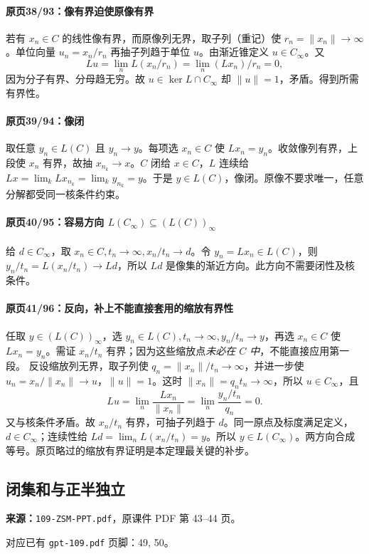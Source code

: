 \paragraph{原页38/93：像有界迫使原像有界}
若有 $x_n\in C$ 的线性像有界，而原像列无界，取子列（重记）使 $r_n=\|x_n\|\to\infty$。单位向量 $u_n=x_n/r_n$ 再抽子列趋于单位 $u$。由渐近锥定义 $u\in C_\infty$。又
\[Lu=\lim_n L(x_n/r_n)=\lim_n(Lx_n)/r_n=0,\]
因为分子有界、分母趋无穷。故 $u\in\ker L\cap C_\infty$ 却 $\|u\|=1$，矛盾。得到所需有界性。
\paragraph{原页39/94：像闭}
取任意 $y_n\in L(C)$ 且 $y_n\to y$。每项选 $x_n\in C$ 使 $Lx_n=y_n$。收敛像列有界，上段使 $x_n$ 有界，故抽 $x_{n_k}\to x$。$C$ 闭给 $x\in C$，$L$ 连续给 $Lx=\lim_kLx_{n_k}=\lim_ky_{n_k}=y$。于是 $y\in L(C)$，像闭。原像不要求唯一，任意分解都受同一核条件约束。
\paragraph{原页40/95：容易方向 $L(C_\infty)\subseteq(L(C))_\infty$}
给 $d\in C_\infty$，取 $x_n\in C,t_n\to\infty,x_n/t_n\to d$。令 $y_n=Lx_n\in L(C)$，则 $y_n/t_n=L(x_n/t_n)\to Ld$，所以 $Ld$ 是像集的渐近方向。此方向不需要闭性及核条件。
\paragraph{原页41/96：反向，补上不能直接套用的缩放有界性}
任取 $y\in(L(C))_\infty$，选 $y_n\in L(C),t_n\to\infty,y_n/t_n\to y$，再选 $x_n\in C$ 使 $Lx_n=y_n$。需证 $x_n/t_n$ 有界；因为这些缩放点\emph{未必在 $C$ 中}，不能直接应用第一段。
反设缩放列无界，取子列使 $q_n=\|x_n\|/t_n\to\infty$，并进一步使 $u_n=x_n/\|x_n\|\to u$，$\|u\|=1$。这时 $\|x_n\|=q_nt_n\to\infty$，所以 $u\in C_\infty$，且
\[Lu=\lim_n\frac{Lx_n}{\|x_n\|}=\lim_n\frac{y_n/t_n}{q_n}=0.\]
又与核条件矛盾。故 $x_n/t_n$ 有界，可抽子列趋于 $d$。同一原点及标度满足定义，$d\in C_\infty$；连续性给 $Ld=\lim_nL(x_n/t_n)=y$。所以 $y\in L(C_\infty)$。两方向合成等号。原页略过的缩放有界证明是本定理最关键的补步。

\clearpage\subsection{闭集和与正半独立}
\textbf{来源：}\texttt{109-ZSM-PPT.pdf}，原课件 PDF 第 43--44 页。\par
对应已有 \texttt{gpt-109.pdf} 页脚：49, 50。\par
